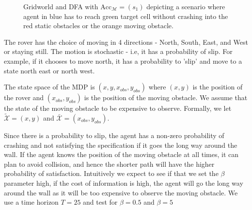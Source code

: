 \begin{figure}
{
}
\caption{Gridworld and DFA  with $\textrm{Acc}_{\mathcal{M}} = (s_1)$ depicting a scenario where agent in blue has to reach green target cell without crashing into the red static obstacles or the orange moving obstacle.}\label{fig:casestudy}
\end{figure}

The rover has the choice of moving in 4 directions - North, South, East, and West or staying still. The motion is stochastic - i.e, it has a probability of slip. For example, if it chooses to move north, it has a probability to 'slip' and move to a state north east or north west. 

The state space of the MDP is $(x,y,x_{obs},y_{obs})$ where $(x,y)$ is the position of the rover and $(x_{obs},y_{obs})$ is the position of the moving obstacle. We assume that the state of the moving obstacle to be expensive to observe. Formally, we let $\mathcal{\tilde{X}} = (x,y)$ and $\mathcal{\bar{X}} = (x_{obs},y_{obs})$. 

Since there is a probability to slip, the agent has a non-zero probability of crashing and not satisfying the specification if it goes the long way around the wall. If the agent knows the position of the moving obstacle at all times, it can plan to avoid collision, and hence the shorter path will have the higher probability of satisfaction. Intuitively we expect to see if that we set the $\beta$ parameter high, \ie if the cost of information is high, the agent will go the long way around the wall as it will be too expensive to observe the moving obstacle. We use a time horizon $T = 25$ and test for $\beta = 0.5$ and $\beta=5$

